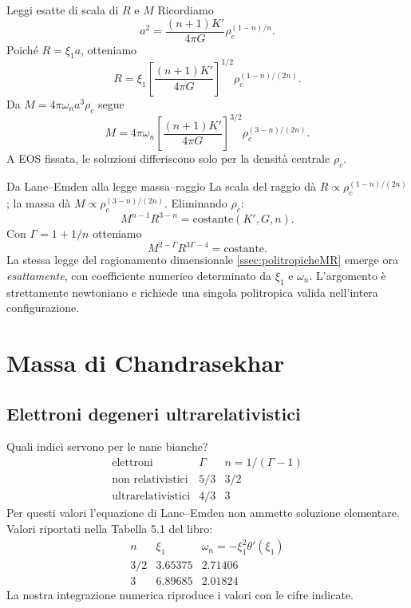 \begin{frame}[t]{Leggi esatte di scala di $R$ e $M$}
\small
Ricordiamo
\[
a^2=\frac{(n+1)K'}{4\pi G}\rho_c^{(1-n)/n}.
\]
Poiché $R=\xi_1a$, otteniamo
\[
R=\xi_1\left[\frac{(n+1)K'}{4\pi G}\right]^{1/2}
\rho_c^{(1-n)/(2n)}.
\]
Da $M=4\pi\omega_n a^3\rho_c$ segue
\[
M=4\pi\omega_n
\left[\frac{(n+1)K'}{4\pi G}\right]^{3/2}
\rho_c^{(3-n)/(2n)}.
\]
A EOS fissata, le soluzioni differiscono solo per la densità centrale $\rho_c$.
\end{frame}

\begin{frame}[t]{Da Lane--Emden alla legge massa--raggio}
\small
La scala del raggio dà $R\propto\rho_c^{(1-n)/(2n)}$; la massa dà $M\propto\rho_c^{(3-n)/(2n)}$.
\medskip
Eliminando $\rho_c$:
\[
M^{n-1}R^{3-n}=\mathrm{costante}(K',G,n).
\]
Con $\Gamma=1+1/n$ otteniamo
\[
M^{2-\Gamma}R^{3\Gamma-4}=\mathrm{costante}.
\]
La stessa legge del ragionamento dimensionale \ref{ssec:politropicheMR} emerge ora \emph{esattamente}, con coefficiente numerico determinato da $\xi_1$ e $\omega_n$.
\medskip
L'argomento è strettamente newtoniano e richiede una singola politropica valida nell'intera configurazione.
\end{frame}

\section{Massa di Chandrasekhar}

\subsection{Elettroni degeneri ultrarelativistici}\label{ssec:eminusdegur}

\begin{frame}[t]{Quali indici servono per le nane bianche?}
\small
\[
\begin{array}{c|c|c}
\text{elettroni} & \Gamma & n=1/(\Gamma-1)\\ \hline
\text{non relativistici} &5/3&3/2\\
\text{ultrarelativistici}&4/3&3
\end{array}
\]
Per questi valori l'equazione di Lane--Emden non ammette soluzione elementare.
\medskip
Valori riportati nella Tabella 5.1 del libro:
\[
\begin{array}{c|c|c}
n& \xi_1 & \omega_n=-\xi_1^2\theta'(\xi_1)\\\hline
3/2&3.65375&2.71406\\
3&6.89685&2.01824
\end{array}
\]
La nostra integrazione numerica riproduce i valori con le cifre indicate.
\end{frame}

